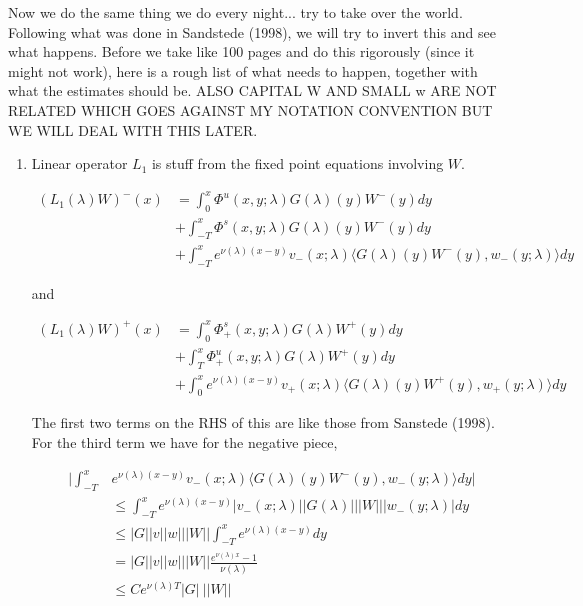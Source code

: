 \documentclass[12pt]{article}
\begin{document}
Now we do the same thing we do every night... try to take over the world. Following what was done in Sandstede (1998), we will try to invert this and see what happens. Before we take like 100 pages and do this rigorously (since it might not work), here is a rough list of what needs to happen, together with what the estimates should be. ALSO CAPITAL W AND SMALL w ARE NOT RELATED WHICH GOES AGAINST MY NOTATION CONVENTION BUT WE WILL DEAL WITH THIS LATER.

\begin{enumerate}

\item Linear operator $L_1$ is stuff from the fixed point equations involving $W$.

\begin{align*}
(L_1(\lambda)W)^-(x) &= \int_0^x \Phi^u(x, y; \lambda) G(\lambda)(y)W^-(y) dy \\
&+ \int_{-T}^x \Phi^s(x, y; \lambda) G(\lambda)(y)W^-(y) dy \\
&+ \int_{-T}^x 
e^{\nu(\lambda)(x-y)} v_-(x; \lambda) \langle G(\lambda)(y)W^-(y), w_-(y; \lambda) \rangle dy 
\end{align*}

and

\begin{align*}
(L_1(\lambda)W)^+(x) &= \int_0^x \Phi^s_+(x, y; \lambda) G(\lambda)W^+(y) dy \\
&+ \int_T^x \Phi^u_+(x, y; \lambda) G(\lambda)W^+(y) dy \\
&+ \int_0^x e^{\nu(\lambda)(x-y)} v_+(x; \lambda) \langle G(\lambda)(y)W^+(y), w_+(y; \lambda) \rangle dy
\end{align*}

The first two terms on the RHS of this are like those from Sanstede (1998). For the third term we have for the negative piece,

\begin{align*}
\Big| \int_{-T}^x &e^{\nu(\lambda)(x-y)} v_-(x; \lambda) \langle G(\lambda)(y)W^-(y), w_-(y; \lambda) \rangle dy \Big| \\
&\leq \int_{-T}^x e^{\nu(\lambda)(x-y)} |v_-(x; \lambda)| |G(\lambda)|||W|||w_-(y; \lambda)|dy \\
&\leq |G||v||w|||W|| \int_{-T}^x e^{\nu(\lambda)(x-y)} dy \\
&= |G||v||w|||W|| \frac{e^{\nu(\lambda)x} - 1}{\nu(\lambda)} \\
&\leq C e^{\nu(\lambda)T} |G| \: ||W||
\end{align*}


\end{enumerate}
\end{document}
